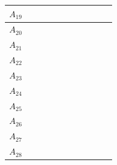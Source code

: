 \documentclass[11pt]{report}
\begin{document}
\begin{table}[h!]
\begin{tabular}{| c | c | c | c | c | c | c | c | c | c | c |}
    \small{$A_{19}$} & \cellcolor{train} & \cellcolor{train} & \cellcolor{train} & \cellcolor{train} & \cellcolor{train} & \cellcolor{train} & \cellcolor{train} & \cellcolor{train} & \cellcolor{train} &  \cellcolor{train} \\ \hline
    \small{$A_{20}$} & \cellcolor{train} & \cellcolor{train} & \cellcolor{train} & \cellcolor{train} & \cellcolor{train} & \cellcolor{train} & \cellcolor{train} & \cellcolor{train} & \cellcolor{train} &  \cellcolor{train} \\ \hline
    \small{$A_{21}$} & \cellcolor{train} & \cellcolor{train} & \cellcolor{train} & \cellcolor{test}  & \cellcolor{train} & \cellcolor{train} & \cellcolor{train} & \cellcolor{train} & \cellcolor{train} &  \cellcolor{train} \\ \hline
    \small{$A_{22}$} & \cellcolor{train} & \cellcolor{train} & \cellcolor{train} & \cellcolor{train} & \cellcolor{train} & \cellcolor{train} & \cellcolor{test}  & \cellcolor{train} & \cellcolor{train} &  \cellcolor{train} \\ \hline
    \small{$A_{23}$} & \cellcolor{train} & \cellcolor{train} & \cellcolor{train} & \cellcolor{train} & \cellcolor{train} & \cellcolor{test}  & \cellcolor{train} & \cellcolor{train} & \cellcolor{train} &  \cellcolor{train} \\ \hline
    \small{$A_{24}$} & \cellcolor{train} & \cellcolor{train} & \cellcolor{train} & \cellcolor{train} & \cellcolor{train} & \cellcolor{train} & \cellcolor{train} & \cellcolor{train} & \cellcolor{train} &  \cellcolor{train} \\ \hline
    \small{$A_{25}$} & \cellcolor{test}  & \cellcolor{train} & \cellcolor{train} & \cellcolor{train} & \cellcolor{train} & \cellcolor{train} & \cellcolor{train} & \cellcolor{train} & \cellcolor{train} &  \cellcolor{train} \\ \hline
    \small{$A_{26}$} & \cellcolor{train} & \cellcolor{train} & \cellcolor{train} & \cellcolor{train} & \cellcolor{train} & \cellcolor{train} & \cellcolor{train} & \cellcolor{train} & \cellcolor{train} &  \cellcolor{train} \\ \hline
    \small{$A_{27}$} & \cellcolor{train} & \cellcolor{train} & \cellcolor{train} & \cellcolor{test}  & \cellcolor{train} & \cellcolor{train} & \cellcolor{train} & \cellcolor{train} & \cellcolor{train} &  \cellcolor{train} \\ \hline
    \small{$A_{28}$} & \cellcolor{train} & \cellcolor{test}  & \cellcolor{train} & \cellcolor{train} & \cellcolor{train} & \cellcolor{train} & \cellcolor{train} & \cellcolor{train} & \cellcolor{test}  &  \cellcolor{train} \\ \hline

\end{tabular}
\end{table}
\end{document}
